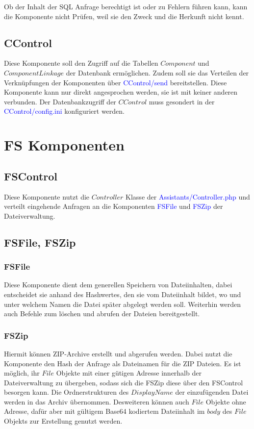 \documentclass[10pt,a4paper,final,parskip]{scrartcl}
\newcommand{\blau}[1]{\textcolor{blue}{#1}}
\begin{document}
Ob der Inhalt der SQL Anfrage berechtigt ist oder zu Fehlern führen kann, kann die Komponente nicht Prüfen, weil sie den Zweck und die Herkunft nicht kennt.

\subsection{CControl}
Diese Komponente soll den Zugriff auf die Tabellen $Component$ und $ComponentLinkage$ der Datenbank ermöglichen. Zudem soll sie das Verteilen der Verknüpfungen der Komponenten über \blau{CControl/send} bereitstellen. Diese Komponente kann nur direkt angesprochen werden, sie ist mit keiner anderen verbunden. Der Datenbankzugriff der $CControl$ muss gesondert in der \blau{CControl/config.ini} konfiguriert werden.

\section{FS Komponenten}
\subsection{FSControl}
Diese Komponente nutzt die $Controller$ Klasse der \blau{Assistants/Controller.php} und verteilt eingehende Anfragen an die Komponenten \blau{FSFile} und \blau{FSZip} der Dateiverwaltung.

\subsection{FSFile, FSZip}
\subsubsection{FSFile}
Diese Komponente dient dem generellen Speichern von Dateiinhalten, dabei entscheidet sie anhand des Hashwertes, den sie vom Dateiinhalt bildet, wo und unter welchem Namen die Datei später abgelegt werden soll. Weiterhin werden auch Befehle zum löschen und abrufen der Dateien bereitgestellt.

\subsubsection{FSZip}
Hiermit können ZIP-Archive erstellt und abgerufen werden. Dabei nutzt die Komponente den Hash der Anfrage als Dateinamen für die ZIP Dateien. Es ist möglich, ihr $File$ Objekte mit einer gütigen Adresse innerhalb der Dateiverwaltung zu übergeben, sodass sich die FSZip diese über den FSControl besorgen kann. Die Ordnerstrukturen des $DisplayName$ der einzufügenden Datei werden in das Archiv übernommen. Desweiteren können auch $File$ Objekte ohne Adresse, dafür aber mit gültigem Base64 kodiertem Dateiinhalt im $body$ des $File$ Objekts zur Erstellung genutzt werden.
\end{document}
